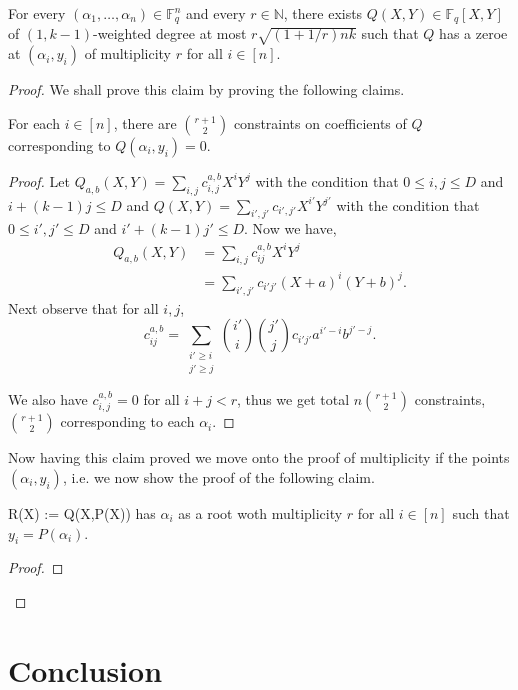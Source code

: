 \begin{lemma}
	For every $(\alpha_1, \ldots, \alpha_n)\in\mathbb{F}_q^n$ and every $r\in\mathbb{N}$, there exists $Q(X,Y)\in\mathbb{F}_q[X,Y]$ of $(1,k-1)$-weighted degree at most $r\sqrt{(1+1/r)nk}$ such that $Q$ has a zeroe at $(\alpha_i, y_i)$ of multiplicity $r$ for all $i\in[n]$.
\end{lemma}
\begin{proof}
	We shall prove this claim by proving the following claims.
	\begin{claim}
		For each $i\in[n]$, there are $\binom{r+1}{2}$ constraints on coefficients of $Q$ corresponding to $Q(\alpha_i, y_i) = 0$.
	\end{claim}
	\begin{proof}
		Let $Q_{a,b}(X,Y) = \sum_{i,j}c_{i,j}^{a,b}X^iY^j$ with the condition that $0\le i,j\le D$ and $i + (k-1)j\le D$ and $Q(X,Y) = \sum_{i',j'}c_{i',j'}X^{i'}Y^{j'}$ with the condition that $0\le i',j'\le D$ and $i' + (k-1)j'\le D$. Now we have,
		\begin{align*}
			Q_{a,b}(X,Y) 
			& = \sum_{i,j}c_{ij}^{a,b}X^iY^j \\
			& = \sum_{i',j'}c_{i'j'}(X+a)^i(Y+b)^j.
		\end{align*}
		Next observe that for all $i,j$, 
		\[
		c_{ij}^{a,b} =  \sum_{\substack{i'\geq i \\ j'\geq j}} \binom{i'}{i}\binom{j'}{j}c_{i'j'}a^{i'-i}b^{j'-j}.
		\]
		
		We also have $c_{i,j}^{a,b} = 0$ for all $i+j<r$, thus we get total $n\binom{r+1}{2}$ constraints, $\binom{r+1}{2}$ corresponding to each $\alpha_i$. 
	\end{proof}
	
	Now having this claim proved we move onto the proof of multiplicity if the points $(\alpha_i, y_i)$, i.e. we now show the proof of the following claim.
	
	\begin{claim}
		R(X) := Q(X,P(X)) has $\alpha_i$ as a root woth multiplicity $r$ for all $i\in[n]$ such that $y_i = P(\alpha_i)$.
	\end{claim}
	\begin{proof}
		
	\end{proof}
	
\end{proof}

\section{Conclusion}
